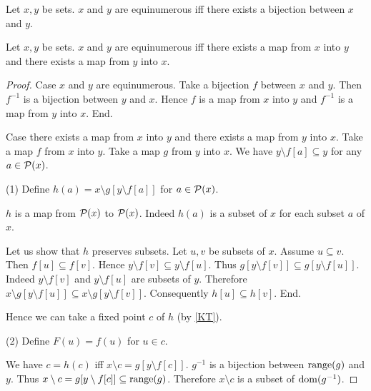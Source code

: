 \documentclass{article}
\begin{document}
  \begin{forthel}
    \begin{definition}
      Let $x, y$ be sets.
      $x$ and $y$ are equinumerous iff there exists a bijection between $x$ and
      $y$.
    \end{definition}
    
    \begin{theorem}\label{CSB}
      Let $x,y$ be sets.
      $x$ and $y$ are equinumerous iff there exists a map from $x$ into $y$ and
      there exists a map from $y$ into $x$.
    \end{theorem}
    \begin{proof}
      Case $x$ and $y$ are equinumerous.
        Take a bijection $f$ between $x$ and $y$.
        Then $f^{-1}$ is a bijection between $y$ and $x$.
        Hence $f$ is a map from $x$ into $y$ and $f^{-1}$ is a map from $y$ into
        $x$.
      End.

      Case there exists a map from $x$ into $y$ and there exists a map from $y$
      into $x$.
        Take a map $f$ from $x$ into $y$.
        Take a map $g$ from $y$ into $x$.
        We have $y \setminus f[a] \subseteq y$ for any $a \in \mathcal{P}(x)$.

        (1) Define $h(a) = x \setminus g[y \setminus f[a]]$ for $a \in \mathcal{P}(x)$.

        $h$ is a map from $\mathcal{P}(x)$ to $\mathcal{P}(x)$.
        Indeed $h(a)$ is a subset of $x$ for each subset $a$ of $x$.

        Let us show that $h$ preserves subsets.
          Let $u, v$ be subsets of $x$.
          Assume $u \subseteq v$.
          Then $f[u] \subseteq f[v]$.
          Hence $y \setminus f[v] \subseteq y \setminus f[u]$.
          Thus $g[y \setminus f[v]] \subseteq g[y \setminus f[u]]$.
          Indeed $y \setminus f[v]$ and $y \setminus f[u]$ are subsets of $y$.
          Therefore $x \setminus g[y \setminus f[u]] \subseteq
          x \setminus g[y \setminus f[v]]$.
          Consequently $h[u] \subseteq h[v]$.
        End.

        Hence we can take a fixed point $c$ of $h$ (by \ref{KT}).

        (2) Define $F(u) = f(u)$ for $u \in c$.

        We have $c = h(c)$ iff $x \setminus c = g[y \setminus f[c]]$.
        $g^{-1}$ is a bijection between $\operatorname{range}(g)$ and $y$.
        Thus $x \setminus c = g[y \setminus f[c]] \subseteq \operatorname{range}(g)$.
        Therefore $x \setminus c$ is a subset of $\operatorname{dom}(g^{-1})$.


\end{proof}
\end{forthel}
\end{document}
